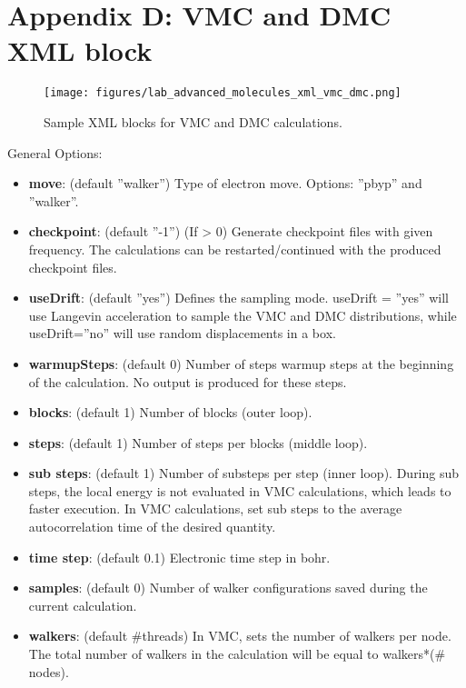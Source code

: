 \newpage
\section{Appendix D: VMC and DMC XML block}

\begin{figure}[ht!]
\begin{center}
\texttt{[image: figures/lab\_advanced\_molecules\_xml\_vmc\_dmc.png]}
\end{center}
\caption{Sample XML blocks for VMC and DMC calculations.
\label{fig:lam_xml_vmc_dmc}
}
\end{figure}

General Options:
\begin{itemize}
\item{\textbf{move}: (default ”walker”) Type of electron move. Options: ”pbyp” and ”walker”.}
\item{\textbf{checkpoint}: (default ”-1”) (If > 0) Generate checkpoint files with given frequency.
The calculations can be restarted/continued with the produced checkpoint files.}
\item{\textbf{useDrift}: (default ”yes”) Defines the sampling mode. useDrift = ”yes” will
use Langevin acceleration to sample the VMC and DMC distributions, while
useDrift=”no” will use random displacements in a box.}
\item{\textbf{warmupSteps}: (default 0) Number of steps warmup steps at the beginning of the
calculation. No output is produced for these steps.}
\item{\textbf{blocks}: (default 1) Number of blocks (outer loop).}
\item{\textbf{steps}: (default 1) Number of steps per blocks (middle loop).}
\item{\textbf{sub steps}: (default 1) Number of substeps per step (inner loop). During sub steps,
the local energy is not evaluated in VMC calculations, which leads to faster execution.
In VMC calculations, set sub steps to the average autocorrelation time of the desired
quantity.}
\item{\textbf{time step}: (default 0.1) Electronic time step in bohr.}
\item{\textbf{samples}: (default 0) Number of walker configurations saved during the current 
calculation.}
\item{\textbf{walkers}: (default \#threads) In VMC, sets the number of walkers per node. The total
number of walkers in the calculation will be equal to walkers*(\# nodes).}
\end{itemize}

